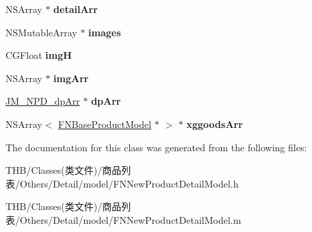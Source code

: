 \begin{DoxyCompactItemize}
N\+S\+Array $\ast$ {\bfseries detail\+Arr}
\item 
\mbox{\label{interface_f_n_new_product_detail_model_af657aa4b5b478123d19d00e8f264b6e7}} 
N\+S\+Mutable\+Array $\ast$ {\bfseries images}
\item 
\mbox{\label{interface_f_n_new_product_detail_model_a482d4cf9c24a34800344f0c6e1b79589}} 
C\+G\+Float {\bfseries imgH}
\item 
\mbox{\label{interface_f_n_new_product_detail_model_aa1d7084e41cfe87147af2d9678b2ce01}} 
N\+S\+Array $\ast$ {\bfseries img\+Arr}
\item 
\mbox{\label{interface_f_n_new_product_detail_model_acd1cbde180ef91fa5aa3d4e3e96b3865}} 
\mbox{\hyperlink{interface_j_m___n_p_d__dp_arr}{J\+M\+\_\+\+N\+P\+D\+\_\+dp\+Arr}} $\ast$ {\bfseries dp\+Arr}
\item 
\mbox{\label{interface_f_n_new_product_detail_model_aab5c54e61378dd25aeb4acfd9f19d542}} 
N\+S\+Array$<$ \mbox{\hyperlink{interface_f_n_base_product_model}{F\+N\+Base\+Product\+Model}} $\ast$ $>$ $\ast$ {\bfseries xggoods\+Arr}
\end{DoxyCompactItemize}


The documentation for this class was generated from the following files\+:\begin{DoxyCompactItemize}
\item 
T\+H\+B/\+Classes(类文件)/商品列表/\+Others/\+Detail/model/F\+N\+New\+Product\+Detail\+Model.\+h\item 
T\+H\+B/\+Classes(类文件)/商品列表/\+Others/\+Detail/model/F\+N\+New\+Product\+Detail\+Model.\+m\end{DoxyCompactItemize}
